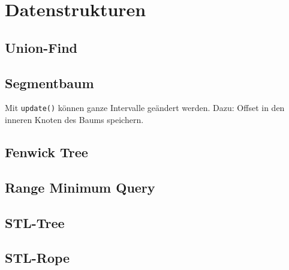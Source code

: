 \section{Datenstrukturen}

\subsection{Union-Find}


\subsection{Segmentbaum}

Mit \lstinline{update()} können ganze Intervalle geändert werden.
Dazu: Offset in den inneren Knoten des Baums speichern.

\subsection{Fenwick Tree}



\subsection{Range Minimum Query}


\subsection{STL-Tree}


\subsection{STL-Rope}

